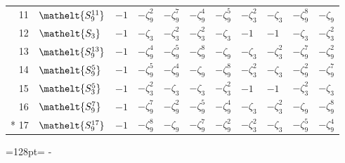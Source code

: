 \documentclass[10pt,a4paper]{article}
\newcommand{\needspace}[1]{\par\penalty-100\begingroup\dimen0=#1\relax\dimen2=\pagegoal
  \advance\dimen2-\pagetotal\ifdim\dimen0>\dimen2\relax\ifdim\dimen2>0pt\vfil\break\fi\fi
  \endgroup}
\numberwithin{equation}{section}
\newcommand{\eltfont}[1]{{\let\sigma\eltsigma\mathelt{#1}}}
\newcommand{\cls}[1]{\eltfont{#1}}
\newcommand{\rootunity}[1]{\zeta_{#1}}
\begin{document}
{\begin{longtable}{@{}rllllllllll@{}}
11 & $\cls{S_{9}^{11}}$ & $-1$ & $-\rootunity{9}^{2}$ & $-\rootunity{9}^{7}$ & $-\rootunity{9}^{4}$ & $-\rootunity{9}^{5}$ & $-\rootunity{3}^{2}$ & $-\rootunity{3}$ & $-\rootunity{9}^{8}$ & $-\rootunity{9}$\\
12 & $\cls{S_{3}}$ & $-1$ & $-\rootunity{3}$ & $-\rootunity{3}^{2}$ & $-\rootunity{3}^{2}$ & $-\rootunity{3}$ & $-1$ & $-1$ & $-\rootunity{3}$ & $-\rootunity{3}^{2}$\\
13 & $\cls{S_{9}^{13}}$ & $-1$ & $-\rootunity{9}^{4}$ & $-\rootunity{9}^{5}$ & $-\rootunity{9}^{8}$ & $-\rootunity{9}$ & $-\rootunity{3}$ & $-\rootunity{3}^{2}$ & $-\rootunity{9}^{7}$ & $-\rootunity{9}^{2}$\\
14 & $\cls{S_{9}^{5}}$ & $-1$ & $-\rootunity{9}^{5}$ & $-\rootunity{9}^{4}$ & $-\rootunity{9}$ & $-\rootunity{9}^{8}$ & $-\rootunity{3}^{2}$ & $-\rootunity{3}$ & $-\rootunity{9}^{2}$ & $-\rootunity{9}^{7}$\\
15 & $\cls{S_{3}^{5}}$ & $-1$ & $-\rootunity{3}^{2}$ & $-\rootunity{3}$ & $-\rootunity{3}$ & $-\rootunity{3}^{2}$ & $-1$ & $-1$ & $-\rootunity{3}^{2}$ & $-\rootunity{3}$\\
16 & $\cls{S_{9}^{7}}$ & $-1$ & $-\rootunity{9}^{7}$ & $-\rootunity{9}^{2}$ & $-\rootunity{9}^{5}$ & $-\rootunity{9}^{4}$ & $-\rootunity{3}$ & $-\rootunity{3}^{2}$ & $-\rootunity{9}$ & $-\rootunity{9}^{8}$\\*
17 & $\cls{S_{9}^{17}}$ & $-1$ & $-\rootunity{9}^{8}$ & $-\rootunity{9}$ & $-\rootunity{9}^{7}$ & $-\rootunity{9}^{2}$ & $-\rootunity{3}^{2}$ & $-\rootunity{3}$ & $-\rootunity{9}^{5}$ & $-\rootunity{9}^{4}$\\
\bottomrule\end{longtable}}
\needspace{128pt}
\end{document}
